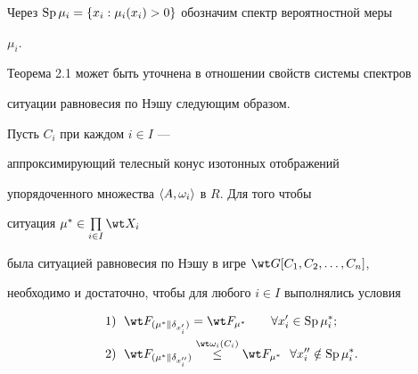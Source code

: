  


Через $\operatorname{Sp}\mu_i=\{x_i:\mu_i(x_i)>0\}$ обозначим спектр вероятностной меры 


$\mu_i$. 


 


Теорема 2.1 может быть уточнена в отношении свойств системы спектров 


ситуации равновесия по Нэшу следующим образом. 


 


\begin{thms} 


Пусть $C_i$ при каждом $i\in I$ --- 


аппроксимирующий телесный конус изотонных отображений 


упорядоченного множества $\langle A,\omega_i\rangle$ в $R$. Для того чтобы 


ситуация $\mu^*\in\prod\limits_{i\in I}\wt X_i$ 


была ситуацией равновесия по Нэшу в игре $\wt G[C_1,C_2,\dotsc,C_n]$, 


необходимо и достаточно, чтобы для любого $i\in I$ выполнялись условия 


\begin{equation} 


\begin{split} 


1)\ \; &\wt F_{(\mu^*\|\delta_{x'_i})}=\wt F_{\mu^*} 


\qquad \forall x'_i\in\SP\mu^*_i; \\ 


2)\ \; &\wt F_{(\mu^*\|\delta_{x''_i})}\up{\wt\omega_i(C_i)}{\le} 


\wt F_{\mu^*}\ \ \forall x''_i\notin\SP\mu^*_i. 


\end{split} 


\end{equation} 


\end{thms} 


 


